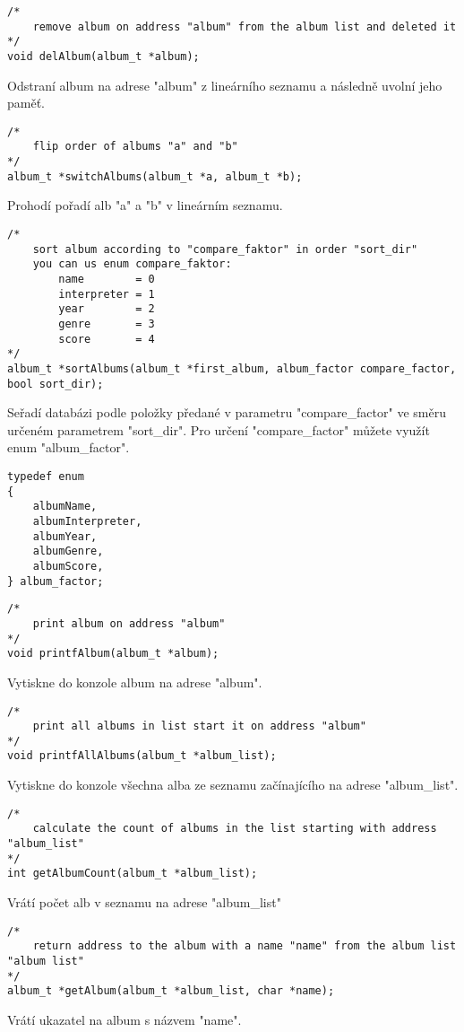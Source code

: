 \begin{lstlisting}[style=CStyle]
/*
	remove album on address "album" from the album list and deleted it
*/
void delAlbum(album_t *album);
\end{lstlisting}
Odstraní album na adrese "album" z lineárního seznamu a následně uvolní jeho paměť.

\begin{lstlisting}[style=CStyle]
/*
    flip order of albums "a" and "b"
*/
album_t *switchAlbums(album_t *a, album_t *b);
\end{lstlisting}
Prohodí pořadí alb "a" a "b" v lineárním seznamu.

\newpage
\begin{lstlisting}[style=CStyle]
/*
	sort album according to "compare_faktor" in order "sort_dir" 
	you can us enum compare_faktor:
        name		= 0
        interpreter = 1
        year		= 2
        genre		= 3
        score		= 4
*/
album_t *sortAlbums(album_t *first_album, album_factor compare_factor, bool sort_dir);
\end{lstlisting}
Seřadí databázi podle položky předané v parametru "compare\_factor" ve směru určeném parametrem "sort\_dir".
Pro určení "compare\_factor" můžete využít enum "album\_factor".
\begin{lstlisting}[style=CStyle]
typedef enum
{
	albumName,
	albumInterpreter,
	albumYear,
	albumGenre,
	albumScore,
} album_factor;
\end{lstlisting}

\begin{lstlisting}[style=CStyle]
/*
	print album on address "album"
*/
void printfAlbum(album_t *album);
\end{lstlisting}
Vytiskne do konzole album na adrese "album".

\begin{lstlisting}[style=CStyle]
/*
	print all albums in list start it on address "album"
*/
void printfAllAlbums(album_t *album_list);
\end{lstlisting}
Vytiskne do konzole všechna alba ze seznamu začínajícího na adrese "album\_list".

\begin{lstlisting}[style=CStyle]
/*
    calculate the count of albums in the list starting with address "album_list"
*/
int getAlbumCount(album_t *album_list);
\end{lstlisting}
Vrátí počet alb v seznamu na adrese "album\_list"

\begin{lstlisting}[style=CStyle]
/*
	return address to the album with a name "name" from the album list "album list"
*/
album_t *getAlbum(album_t *album_list, char *name);
\end{lstlisting}
Vrátí ukazatel na album s názvem "name".